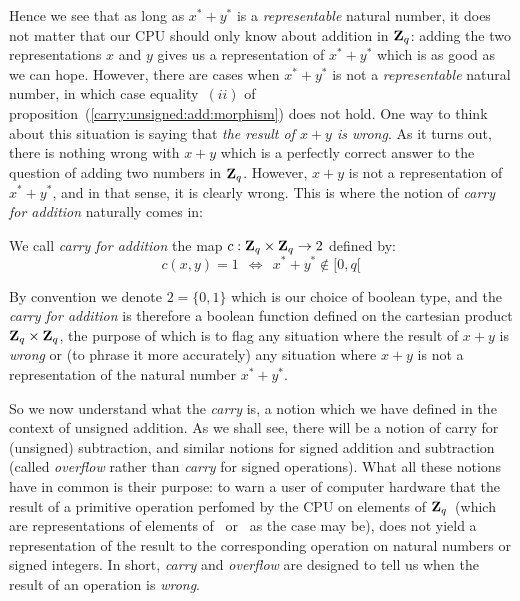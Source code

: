 \documentclass{article}
\newcommand{\zq}{\mbox{${\bf Z}_{q}$}}
\begin{document}
Hence we see that as long as $x^{*}+y^{*}$ is a {\em representable} natural
number, it does not matter that our CPU should only know about addition in \zq:
adding the two representations $x$ and $y$ gives us a representation of 
$x^{*}+y^{*}$ which is as good as we can hope. However, there are cases 
when $x^{*} + y^{*}$ is not a {\em representable} natural number, in which 
case equality~$(ii)$ of proposition~(\ref{carry:unsigned:add:morphism}) 
does not hold. One way to think about this situation is saying that 
{\em the result of $x+y$ is wrong}. As it turns out, there is nothing wrong 
with $x+y$ which is a perfectly correct answer to the question of adding 
two numbers in \zq. However, $x+y$ is not a representation of $x^{*}+y^{*}$, 
and in that sense, it is clearly wrong. This is where the notion of 
{\em carry for addition} naturally comes in:

\begin{defin}\label{carry:unsigned:add:carry}
We call {\em carry for addition} the map $c:\zq\times\zq\rightarrow2$ defined by:
  \[
    c(x,y) = 1  \ \ \Leftrightarrow\ \ x^{*} + y^{*} \not\in[0,q[
  \]
\end{defin}

By convention we denote $2=\{0,1\}$ which is our choice of boolean type, 
and the {\em carry for addition} is therefore a boolean function defined 
on the cartesian product $\zq\times\zq$, the purpose of which
is to flag any situation where the result of $x+y$ is {\em wrong} or (to
phrase it more accurately) any situation where $x+y$ is not a representation 
of the natural number $x^{*}+y^{*}$. 

So we now understand what the {\em carry} is, a notion which we have defined 
in the context of unsigned addition. As we shall see, there will be a notion 
of carry for (unsigned) subtraction, and similar notions for signed addition 
and subtraction (called {\em overflow} rather than {\em carry} for signed 
operations). What all these notions have in common is their purpose: 
to warn a user of computer hardware that the result of a primitive operation 
perfomed by the CPU on elements of \zq\ (which are representations of elements
of \N\ or \Z\ as the case may be), does not yield a representation of the result 
to the corresponding operation on natural numbers or signed integers. In short, 
{\em carry} and {\em overflow} are designed to tell us when the result of an
operation is {\em wrong}.
\end{document}
